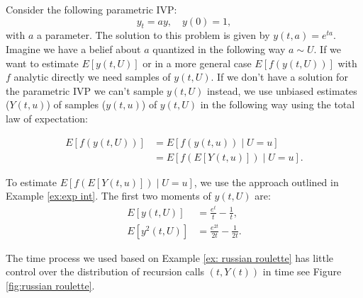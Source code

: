 \documentclass[a4paper,12pt]{article}
\begin{document}
\begin{example} \label{ex:random ode}
    Consider the following parametric IVP:
    \begin{equation}\label{eq:random ode}
        y_t = ay, \quad y(0)=1,
    \end{equation}
    with $a$ a parameter. The solution to this problem is given by
    $y(t,a) = e^{ta}$. Imagine we have a belief about $a$ quantized
    in the following way $a\sim U$. If we want
    to estimate $E[y(t, U)]$ or in a more general case
    $E[f(y(t, U))]$ with $f$ analytic directly
    we need samples of $y(t,U)$. If we don't have a solution for the parametric IVP
    we can't sample $y(t,U)$ instead, we use unbiased estimates ($Y(t,u)$) of samples ($y(t,u)$)
    of $y(t, U)$ in the following
    way using the total law of expectation:

    \begin{align}
        E[f(y(t,U))] & = E[f(y(t,u)) \mid U=u]     \\
                     & = E[f(E[Y(t,u)]) \mid U=u].
    \end{align}

    To estimate $E[f(E[Y(t,u)]) \mid U =u]$, we use the approach outlined in
    Example \ref{ex:exp int}. The first two moments of $y(t, U)$ are:
    \begin{align}
        E[y(t,U)]      & = \frac{e^t}{t} - \frac{1}{t},      \\
        E[y^{2}(t, U)] & = \frac{e^{2t}}{2t} - \frac{1}{2t}.
    \end{align}
\end{example}

\begin{pythonn}
\end{pythonn}

\vspace{0.5cm}

The time process we used based on Example \ref{ex: russian roulette}
has little control over the distribution of recursion calls $(t,Y(t))$
in time see Figure \ref{fig:russian roulette}.
\end{document}
